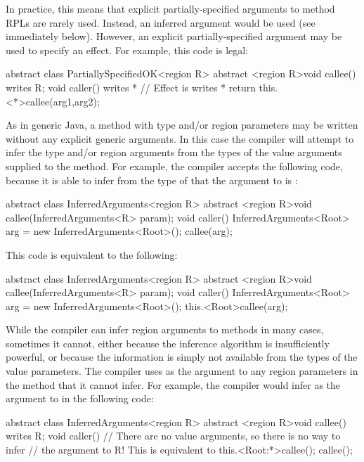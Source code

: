 In practice, this means that explicit partially-specified arguments to
method RPLs are rarely used.  Instead, an inferred argument would be
used (see immediately below).  However, an explicit
partially-specified argument may be used to specify an effect.  For
example, this code is legal:
%
\begin{dpjlisting}
abstract class PartiallySpecifiedOK<region R> {
    abstract <region R>void callee() writes R;
    void caller() writes * {
        // Effect is writes *
        return this.<*>callee(arg1,arg2);
    }
}
\end{dpjlisting}
%


 As in generic Java, a method with type
and/or region parameters may be written without any explicit generic
arguments.  In this case the compiler will attempt to infer the type
and/or region arguments from the types of the value arguments supplied
to the method.  For example, the  compiler accepts the
following code, because it is able to infer from the type
 of  that the argument to
 is :
%
\begin{dpjlisting}
abstract class InferredArguments<region R> {
    abstract <region R>void callee(InferredArguments<R> param);
    void caller() {
        InferredArguments<Root> arg = new InferredArguments<Root>();
        callee(arg);
    }
}
\end{dpjlisting}
%
This code is equivalent to the following:
%
\begin{dpjlisting}
abstract class InferredArguments<region R> {
    abstract <region R>void callee(InferredArguments<R> param);
    void caller() {
        InferredArguments<Root> arg = new InferredArguments<Root>();
        this.<Root>callee(arg);
    }
}
\end{dpjlisting}

While the compiler can infer region arguments to methods in many
cases, sometimes it cannot, either because the inference algorithm is
insufficiently powerful, or because the information is simply not
available from the types of the value parameters.  The compiler uses
 as the argument to any region parameters in the method
that it cannot infer.  For example, the compiler would infer
 as the argument to  in the following code:
%
\begin{dpjlisting}
abstract class InferredArguments<region R> {
    abstract <region R>void callee() writes R;
    void caller() {
        // There are no value arguments, so there is no way to infer
        // the argument to R!  This is equivalent to this.<Root:*>callee();
        callee();
    }
}
\end{dpjlisting}

